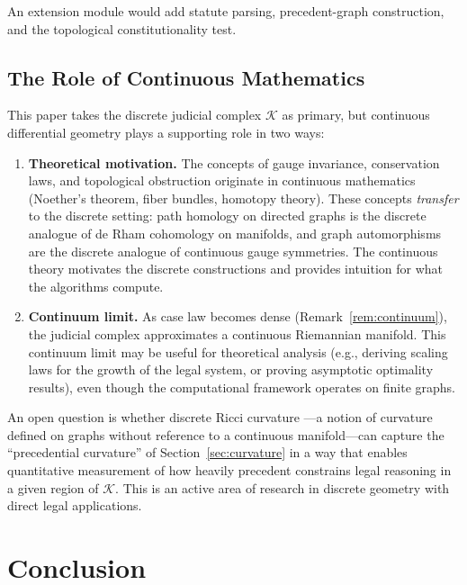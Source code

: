 \documentclass[12pt]{article}
\theoremstyle{definition}
\theoremstyle{remark}
\begin{document}
An extension module would add statute parsing, precedent-graph construction, and the topological constitutionality test.

\subsection{The Role of Continuous Mathematics}
\label{sec:discrete}

This paper takes the discrete judicial complex $\mathcal{K}$ as primary, but continuous differential geometry plays a supporting role in two ways:

\begin{enumerate}
    \item \textbf{Theoretical motivation.}  The concepts of gauge invariance, conservation laws, and topological obstruction originate in continuous mathematics (Noether's theorem, fiber bundles, homotopy theory).  These concepts \emph{transfer} to the discrete setting: path homology on directed graphs is the discrete analogue of de Rham cohomology on manifolds, and graph automorphisms are the discrete analogue of continuous gauge symmetries.  The continuous theory motivates the discrete constructions and provides intuition for what the algorithms compute.

    \item \textbf{Continuum limit.}  As case law becomes dense (Remark~\ref{rem:continuum}), the judicial complex approximates a continuous Riemannian manifold.  This continuum limit may be useful for theoretical analysis (e.g., deriving scaling laws for the growth of the legal system, or proving asymptotic optimality results), even though the computational framework operates on finite graphs.
\end{enumerate}

An open question is whether discrete Ricci curvature \cite{ollivier2009}---a notion of curvature defined on graphs without reference to a continuous manifold---can capture the ``precedential curvature'' of Section~\ref{sec:curvature} in a way that enables quantitative measurement of how heavily precedent constrains legal reasoning in a given region of $\mathcal{K}$.  This is an active area of research in discrete geometry with direct legal applications.


\section{Conclusion}
\label{sec:conclusion}
\end{document}
